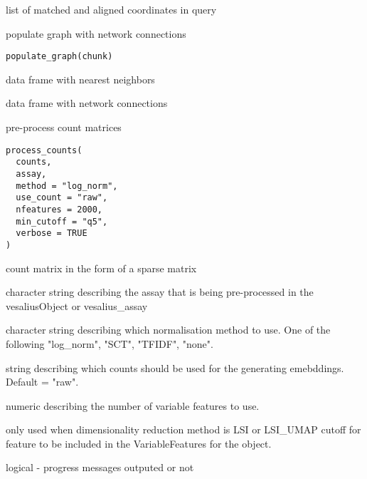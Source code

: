 \documentclass[a4paper]{book}
\begin{document}
%
\begin{Value}
list of matched and aligned coordinates in query
\end{Value}
%
\begin{Description}
populate graph with network connections
\end{Description}
%
\begin{Usage}
\begin{verbatim}
populate_graph(chunk)
\end{verbatim}
\end{Usage}
%
\begin{Arguments}
\begin{ldescription}
\item[\code{chunk}] data frame with nearest neighbors
\end{ldescription}
\end{Arguments}
%
\begin{Value}
data frame with network connections
\end{Value}
%
\begin{Description}
pre-process count matrices
\end{Description}
%
\begin{Usage}
\begin{verbatim}
process_counts(
  counts,
  assay,
  method = "log_norm",
  use_count = "raw",
  nfeatures = 2000,
  min_cutoff = "q5",
  verbose = TRUE
)
\end{verbatim}
\end{Usage}
%
\begin{Arguments}
\begin{ldescription}
\item[\code{counts}] count matrix in the form of a sparse matrix

\item[\code{assay}] character string describing the assay that is being 
pre-processed in the vesaliusObject or vesalius\_assay

\item[\code{method}] character string describing which normalisation method to use.
One of the following "log\_norm", "SCT", "TFIDF", "none".

\item[\code{use\_count}] string describing which counts should be used for the 
generating emebddings. Default = "raw".

\item[\code{nfeatures}] numeric describing the number of variable features to use.

\item[\code{min\_cutoff}] only used when dimensionality reduction method is
LSI or LSI\_UMAP cutoff for feature to be included in the 
VariableFeatures for the object.

\item[\code{verbose}] logical - progress messages outputed or not
\end{ldescription}
\end{Arguments}
\end{document}
